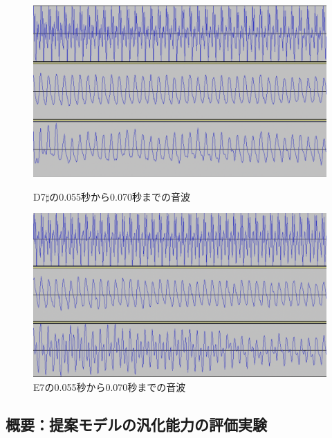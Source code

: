 \begin{figure}[b]
\begin{center}
\begin{minipage}{0.48\hsize}
\begin{center}
\includegraphics[width=0.9\hsize]{figure/88_88_det/d7s_0550_0700.png}
\caption{D7$\sharp$の0.055秒から0.070秒までの音波}
\label{fig:88_88_bad1}
\end{center}
\end{minipage}
\begin{minipage}{0.48\hsize}
\begin{center}
\includegraphics[width=0.9\hsize]{figure/88_88_det/e7_0550_0700.png}
\caption{E7の0.055秒から0.070秒までの音波}
\label{fig:88_88_bad2}
\end{center}
\end{minipage}
\end{center}
\end{figure}

\clearpage

\subsection{概要：提案モデルの汎化能力の評価実験}

